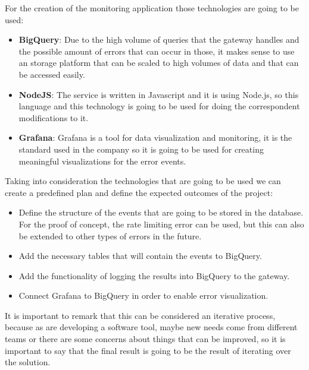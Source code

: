 \documentclass[12pt]{article}
\begin{document}
For the creation of the monitoring application those technologies are going to be used:

\begin{itemize}
    \item \textbf{BigQuery}: Due to the high volume of queries that the gateway handles and the possible amount of errors that can occur in those, it makes sense to use an storage platform that can be scaled to high volumes of data and that can be accessed easily.
    \item \textbf{NodeJS}: The service is written in Javascript and it is using Node.js, so this language and this technology is going to be used for doing the correspondent modifications to it.
    \item \textbf{Grafana}: Grafana is a tool for data visualization and monitoring, it is the standard used in the company so it is going to be used for creating meaningful visualizations for the error events.
\end{itemize}

Taking into consideration the technologies that are going to be used we can create a predefined plan and define the expected outcomes of the project:

\begin{itemize}
    \item Define the structure of the events that are going to be stored in the database. For the proof of concept, the rate limiting error can be used, but this can also be extended to other types of errors in the future.
    \item Add the necessary tables that will contain the events to BigQuery.
    \item Add the functionality of logging the results into BigQuery to the gateway.
    \item Connect Grafana to BigQuery in order to enable error visualization.
\end{itemize}

It is important to remark that this can be considered an iterative process, because as  are developing a software tool, maybe new needs come from different teams or there are some concerns about things that can be improved, so it is important to say that the final result is going to be the result of iterating over the solution.



\end{document}
